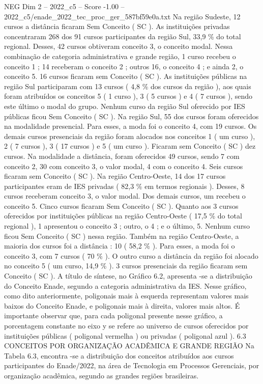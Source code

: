 \begin{textsample}{NEG Dim 2 – 2022\_c5 – Score -1.00 – 2022\_c5/enade\_2022\_tec\_proc\_ger\_587bf59e0a.txt}
Na região Sudeste, 12 cursos a distância ficaram Sem Conceito ( SC ).
As instituições privadas concentraram 268 dos 91 cursos participantes da região Sul, 33,9 \% do total regional.
Desses, 42 cursos obtiveram conceito 3, o conceito modal.
Nessa combinação de categoria administrativa e grande região, 1 curso recebeu o conceito 1 ; 14 receberam o conceito 2 ; outros 16, o conceito 4 ; e ainda 2, o conceito 5. 16 cursos ficaram sem Conceito ( SC ).
As instituições públicas na região Sul participaram com 13 cursos ( 4,8 \% dos cursos da região ), aos quais foram atribuídos os conceitos 5 ( 1 curso ), 3 ( 5 cursos ) e 4 ( 7 cursos ), sendo este último o modal do grupo.
Nenhum curso da região Sul oferecido por IES públicas ficou Sem Conceito ( SC ).
Na região Sul, 55 dos cursos foram oferecidos na modalidade presencial.
Para esses, a moda foi o conceito 4, com 19 cursos.
Os demais cursos presenciais da região foram alocados nos conceitos 1 ( um curso ), 2 ( 7 cursos ), 3 ( 17 cursos ) e 5 ( um curso ).
Ficaram sem Conceito ( SC ) dez cursos.
Na modalidade a distância, foram oferecidos 49 cursos, sendo 7 com conceito 2, 30 com conceito 3, o valor modal, 4 com o conceito 4.
Seis cursos ficaram sem Conceito ( SC ).
Na região Centro-Oeste, 14 dos 17 cursos participantes eram de IES privadas ( 82,3 \% em termos regionais ).
Desses, 8 cursos receberam conceito 3, o valor modal.
Dos demais cursos, um recebeu o conceito 5.
Cinco cursos ficaram Sem Conceito ( SC ).
Quanto aos 3 cursos oferecidos por instituições públicas na região Centro-Oeste ( 17,5 \% do total regional ), 1 apresentou o conceito 3 ; outro, o 4 ; e o último, 5.
Nenhum curso ficou Sem Conceito ( SC ) nessa região.
Também na região Centro-Oeste, a maioria dos cursos foi a distância : 10 ( 58,2 \% ).
Para esses, a moda foi o conceito 3, com 7 cursos ( 70 \% ).
O outro curso a distância da região foi alocado no conceito 5 ( um curso, 14,9 \% ). 3 cursos presenciais da região ficaram sem Conceito ( SC ).
A título de síntese, no Gráfico 6.2, apresenta -se a distribuição do Conceito Enade, segundo a categoria administrativa da IES.
Nesse gráfico, como dito anteriormente, poligonais mais à esquerda representam valores mais baixos do Conceito Enade, e poligonais mais à direita, valores mais altos.
É importante observar que, para cada poligonal presente nesse gráfico, a porcentagem constante no eixo y se refere ao universo de cursos oferecidos por instituições públicas ( poligonal vermelha ) ou privadas ( poligonal azul ). 6.3 CONCEITOS POR ORGANIZAÇÃO ACADÊMICA E GRANDE REGIÃO Na Tabela 6.3, encontra -se a distribuição dos conceitos atribuídos aos cursos participantes do Enade/2022, na área de Tecnologia em Processos Gerenciais, por organização acadêmica, segundo as grandes regiões brasileiras.

\end{textsample}
